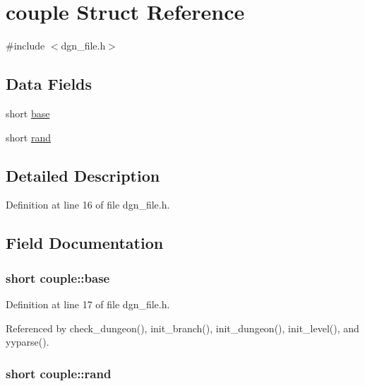 \hypertarget{structcouple}{\section{couple Struct Reference}
\label{structcouple}
}


{\ttfamily \#include $<$dgn\+\_\+file.\+h$>$}

\subsection*{Data Fields}
\begin{DoxyCompactItemize}
\item 
short \hyperlink{structcouple_a55ed9c0c0f404868c036f550ce592876}{base}
\item 
short \hyperlink{structcouple_a5fa871982450a8f9ccb49f3b73f471c3}{rand}
\end{DoxyCompactItemize}


\subsection{Detailed Description}


Definition at line 16 of file dgn\+\_\+file.\+h.



\subsection{Field Documentation}
\hypertarget{structcouple_a55ed9c0c0f404868c036f550ce592876}{
\subsubsection[{base}]{\setlength{\rightskip}{0pt plus 5cm}short couple\+::base}}\label{structcouple_a55ed9c0c0f404868c036f550ce592876}


Definition at line 17 of file dgn\+\_\+file.\+h.



Referenced by check\+\_\+dungeon(), init\+\_\+branch(), init\+\_\+dungeon(), init\+\_\+level(), and yyparse().

\hypertarget{structcouple_a5fa871982450a8f9ccb49f3b73f471c3}{
\subsubsection[{rand}]{\setlength{\rightskip}{0pt plus 5cm}short couple\+::rand}}\label{structcouple_a5fa871982450a8f9ccb49f3b73f471c3}


